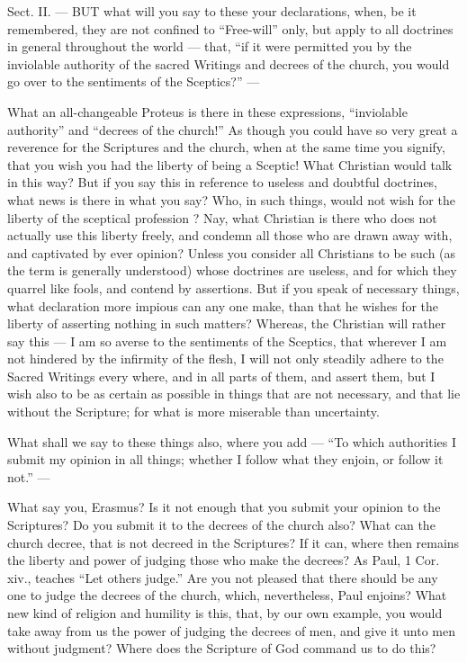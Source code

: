 

Sect. II. — BUT what will you say to these your declarations, when, be it remembered, they are not confined to “Free-will” only, but apply to all doctrines in general throughout the world — that, “if it were permitted you by the inviolable authority of the sacred Writings and decrees of the church, you would go over to the sentiments of the Sceptics?” —

What an all-changeable Proteus is there in these expressions, “inviolable authority” and “decrees of the church!” As though you could have so very great a reverence for the Scriptures and the church, when at the same time you signify, that you wish you had the liberty of being a Sceptic! What Christian would talk in this way? But if you say this in reference to useless and doubtful doctrines, what news is there in what you say? Who, in such things, would not wish for the liberty of the sceptical profession ? Nay, what Christian is there who does not actually use this liberty freely, and condemn all those who are drawn away with, and captivated by ever opinion? Unless you consider all Christians to be such (as the term is generally understood) whose doctrines are useless, and for which they quarrel like fools, and contend by assertions. But if you speak of necessary things, what declaration more impious can any one make, than that he wishes for the liberty of asserting nothing in such matters? Whereas, the Christian will rather say this — I am so averse to the sentiments of the Sceptics, that wherever I am not hindered by the infirmity of the flesh, I will not only steadily adhere to the Sacred Writings every where, and in all parts of them, and assert them, but I wish also to be as certain as possible in things that are not necessary, and that lie without the Scripture; for what is more miserable than uncertainty.

What shall we say to these things also, where you add — “To which authorities I submit my opinion in all things; whether I follow what they enjoin, or follow it not.” —

What say you, Erasmus? Is it not enough that you submit your opinion to the Scriptures? Do you submit it to the decrees of the church also? What can the church decree, that is not decreed in the Scriptures? If it can, where then remains the liberty and power of judging those who make the decrees? As Paul, 1 Cor. xiv., teaches “Let others judge.” Are you not pleased that there should be any one to judge the decrees of the church, which, nevertheless, Paul enjoins? What new kind of religion and humility is this, that, by our own example, you would take away from us the power of judging the decrees of men, and give it unto men without judgment? Where does the Scripture of God command us to do this?

